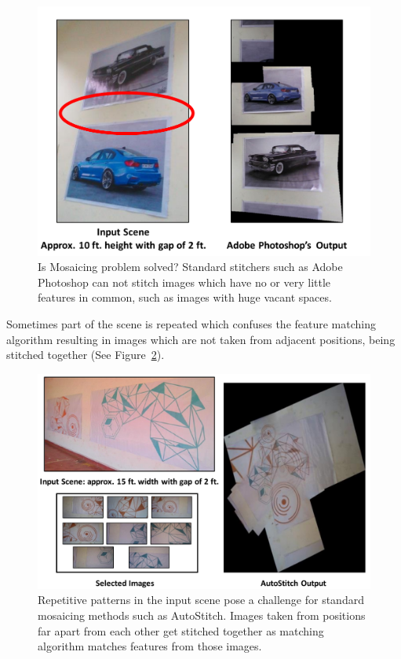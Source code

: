 \begin{itemize}
  \begin{figure}[h!]
\centering
\includegraphics[width=0.98\linewidth]{figures/vacantSpacesExample}
 \caption[Problem of mosaicing scene with vacant spaces using Adobe
 Photoshop]{Is Mosaicing problem solved? Standard stitchers such as Adobe Photoshop can not stitch images which have no or very little features in
 common, such as images with huge vacant spaces.}
\label{fig:vacantSpacesExample}
\end{figure}
 
  Sometimes part of the scene is repeated which confuses the feature matching
  algorithm resulting in images which are not taken from adjacent positions,
  being stitched together (See Figure~\ref{fig:confusingFeatures}).

\begin{figure}[h!]
\centering
\includegraphics[width=0.98\linewidth]{figures/confusingFeaturesExample}
\caption[Problem of confusing features in AutoStitch]{Repetitive patterns in the
input scene pose a challenge for standard mosaicing methods such as AutoStitch. Images taken from positions
far apart from each other get stitched together as matching algorithm matches
features from those images.}
\label{fig:confusingFeatures}
\end{figure}  


\end{itemize}
